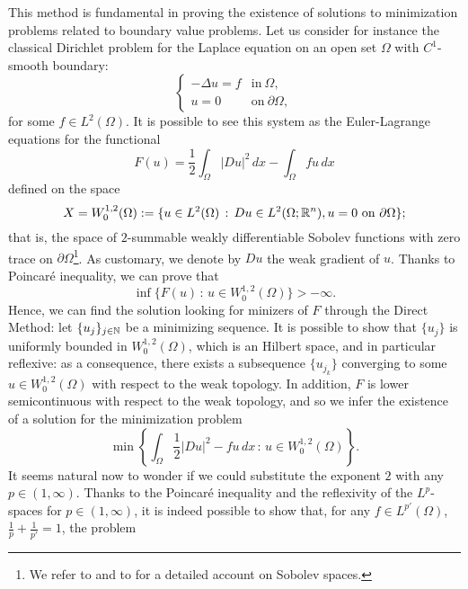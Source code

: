 This method is fundamental in proving the existence of solutions to minimization problems related to boundary value problems. Let us consider for instance the classical Dirichlet problem for the Laplace equation on an open set $\Omega$ with $C^{1}$-smooth boundary:
\begin{equation*}
\begin{cases} 
- \Delta u = f & \text{in} \ \Omega, \\
u = 0 & \text{on} \ \partial \Omega,
\end{cases}
\end{equation*}
for some $f \in L^{2}(\Omega)$.
It is possible to see this system as the Euler-Lagrange equations for the functional
\begin{equation*}
F(u) = \frac{1}{2} \int_{\Omega} |D u|^{2} \, dx - \int_{\Omega} f u \, dx
\end{equation*}
defined on the space 
\begin{equation*}
X = W^{1, 2}_{0}(\Omega) := \{ u \in L^{2}(\Omega) \, : \,  Du \in L^{2}(\Omega; \mathbb{R}^{n}), u = 0 \ \text{on} \ \partial \Omega \};
\end{equation*}
that is, the space of $2$-summable weakly differentiable Sobolev functions with zero trace on $\partial \Omega$\footnote{We refer to \cite[Chapter 5]{EvansPDE} and to \cite[Chapter 4]{evans2015measure} for a detailed account on Sobolev spaces.}. As customary, we denote by $Du$ the weak gradient of $u$.
Thanks to Poincar\'e inequality, we can prove that 
\begin{equation*}
\inf \{ F(u) \, :\, u \in W^{1, 2}_{0}(\Omega) \} > - \infty.
\end{equation*}
Hence, we can find the solution looking for minizers of $F$ through the Direct Method: let $\{u_{j}\}_{j \in \mathbb{N}}$ be a minimizing sequence. It is possible to show that $\{u_{j}\}$ is uniformly bounded in $W^{1, 2}_{0}(\Omega)$, which is an Hilbert space, and in particular reflexive: as a consequence, there exists a subsequence $\{u_{j_{k}}\}$ converging to some $u \in W^{1, 2}_{0}(\Omega)$ with respect to the weak topology. In addition, $F$ is lower semicontinuous with respect to the weak topology, and so we infer the existence of a solution for the minimization problem
\begin{equation*}
\min \left \{ \int_{\Omega} \frac{1}{2} |D u|^{2} - f u \, dx \, : \, u \in W^{1, 2}_{0}(\Omega) \right \}.
\end{equation*}
It seems natural now to wonder if we could substitute the exponent $2$ with any $p \in (1, \infty)$. Thanks to the Poincar\'e inequality and the reflexivity of the $L^{p}$-spaces for $p \in (1, \infty)$, it is indeed possible to show that, for any $f \in L^{p'}(\Omega)$, $\frac{1}{p} + \frac{1}{p'} = 1$, the problem
